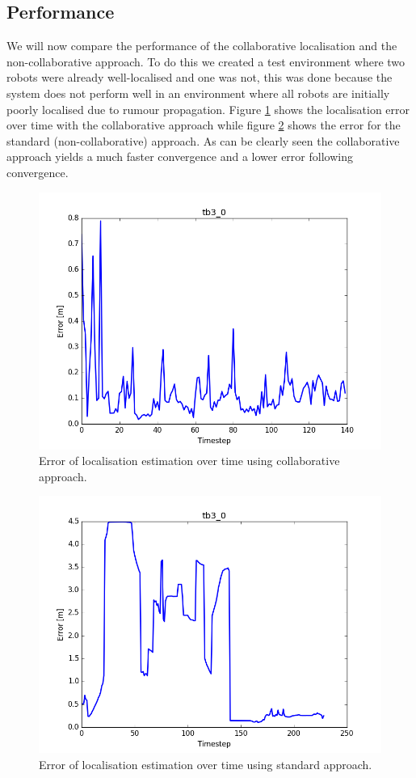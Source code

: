 \documentclass[10pt,a4paper]{article}
\begin{document}
\subsection{Performance}
We will now compare the performance of the collaborative localisation and the non-collaborative approach. To do this we created a test environment where two robots were already well-localised and one was not, this was done because the system does not perform well in an environment where all robots are initially poorly localised due to rumour propagation. Figure \ref{fig:loca1} shows the localisation error over time with the collaborative approach while figure \ref{fig:loca2} shows the error for the standard (non-collaborative) approach. As can be clearly seen the collaborative approach yields a much faster convergence and a lower error following convergence.
\begin{figure}
	\centering
	\includegraphics[width=\columnwidth]{figure_l1.png}
	\caption{Error of localisation estimation over time using collaborative approach.}
	\label{fig:loca1}
\end{figure}
\begin{figure}
	\includegraphics[width=\columnwidth]{figure_l2.png}
	\caption{Error of localisation estimation over time using standard approach.}
	\label{fig:loca2}
\end{figure}
\end{document}
